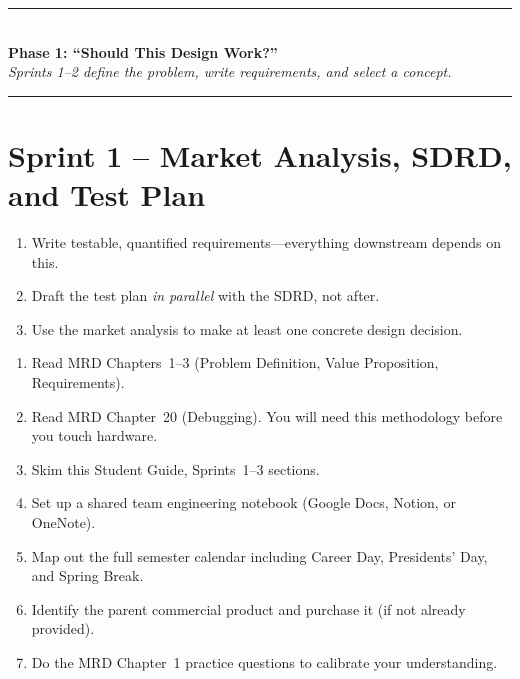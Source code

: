\documentclass[11pt,letterpaper]{article}
\begin{document}
\vspace{0.5em}
\begin{center}
\textcolor{minesblue}{\rule{0.6\textwidth}{1pt}}\\[4pt]
{\Large\bfseries\sffamily\color{minesblue} Phase 1: ``Should This Design Work?''}\\[2pt]
{\small\itshape Sprints 1--2 define the problem, write requirements, and select a concept.}\\[4pt]
\textcolor{minesblue}{\rule{0.6\textwidth}{1pt}}
\end{center}
\vspace{0.5em}
\section{Sprint 1 -- Market Analysis, SDRD, and Test Plan}

\begin{priorities}
\begin{enumerate}[leftmargin=*, itemsep=1pt, topsep=0pt]
    \item Write testable, quantified requirements---everything downstream depends on this.
    \item Draft the test plan \textit{in parallel} with the SDRD, not after.
    \item Use the market analysis to make at least one concrete design decision.
\end{enumerate}
\end{priorities}

\begin{checklistbox}
\begin{enumerate}[leftmargin=*, itemsep=1pt, topsep=0pt]
    \item Read MRD Chapters~1--3 (Problem Definition, Value Proposition, Requirements).
    \item Read MRD Chapter~20 (Debugging). You will need this methodology before you touch hardware.
    \item Skim this Student Guide, Sprints~1--3 sections.
    \item Set up a shared team engineering notebook (Google Docs, Notion, or OneNote).
    \item Map out the full semester calendar including Career Day, Presidents' Day, and Spring Break.
    \item Identify the parent commercial product and purchase it (if not already provided).
    \item Do the MRD Chapter~1 practice questions to calibrate your understanding.
\end{enumerate}
\end{checklistbox}
\end{document}
